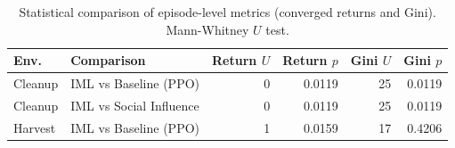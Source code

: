 \begin{table}[htbp]
\caption{Statistical comparison of episode-level metrics (converged returns and Gini). Mann-Whitney $U$ test.}
\label{tab:episode_stats}
\centering
\footnotesize
\begin{tabular}{llrrrr}
\toprule
\textbf{Env.} & \textbf{Comparison} & \textbf{Return $U$} & \textbf{Return $p$} & \textbf{Gini $U$} & \textbf{Gini $p$} \\
\midrule
  Cleanup & IML vs Baseline (PPO) & 0 & 0.0119 & 25 & 0.0119 \\
  Cleanup & IML vs Social Influence & 0 & 0.0119 & 25 & 0.0119 \\
  Harvest & IML vs Baseline (PPO) & 1 & 0.0159 & 17 & 0.4206 \\
\bottomrule
\end{tabular}
\end{table}
